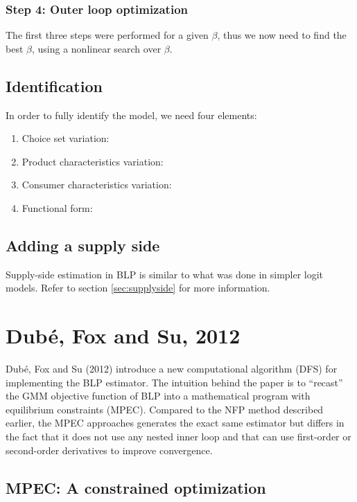 \subsubsection{Step 4: Outer loop optimization}

The first three steps were performed for a given $\beta$, thus we now need to find the best $\beta$, using a nonlinear search over $\beta$.

\subsection{Identification}

In order to fully identify the model, we need four elements:\begin{enumerate}
\item Choice set variation:
\item Product characteristics variation:
\item Consumer characteristics variation:
\item Functional form:
\end{enumerate}

\subsection{Adding a supply side}

Supply-side estimation in BLP is similar to what was done in simpler logit models. Refer to section \ref{sec:supplyside} for more information.

\section{Dubé, Fox and Su, 2012}

Dubé, Fox and Su (2012) introduce a new computational algorithm (DFS) for implementing the BLP estimator. The intuition behind the paper is to ``recast'' the GMM objective function of BLP into a mathematical program with equilibrium constraints (MPEC). Compared to the NFP method described earlier, the MPEC approaches generates the exact same estimator but differs in the fact that it does not use any nested inner loop and that can use first-order or second-order derivatives to improve convergence.

\subsection{MPEC: A constrained optimization}

